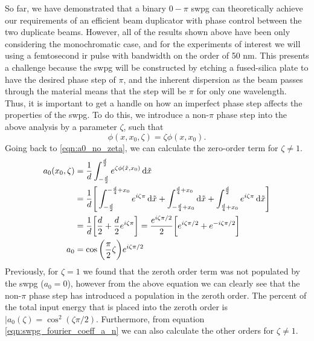 So far, we have demonstrated that a binary $0-\pi$ \gls{swpg} can theoretically achieve our requirements of an efficient beam duplicator with phase control between the two duplicate beams.  However, all of the results shown above have been only considering the monochromatic case, and for the experiments of interest we will using a femtosecond \gls{ir} pulse with bandwidth on the order of 50 nm.  This presents a challenge because the \gls{swpg} will be constructed by etching a fused-silica plate to have the desired phase step of $\pi$, and the inherent dispersion as the beam passes through the material means that the step will be $\pi$ for only one wavelength.  Thus, it is important to get a handle on how an imperfect phase step affects the properties of the \gls{swpg}.  To do this, we introduce a non-$\pi$ phase step into the above analysis by a parameter $\zeta$, such that
\begin{equation}
\label{eqn:zeta}
	\phi(x,x_0,\zeta)=\zeta \phi(x,x_0).
\end{equation}
Going back to \ref{eqn:a0_no_zeta}, we can calculate the zero-order term for $\zeta\neq1$.
\begin{equation}
\label{eqn:a_0_zeta}
	\begin{aligned}
	a_0(x_0,\zeta) &= \frac{1}{d}\int_{-\frac{d}{2}}^{\frac{d}{2}} e^{\zeta\phi(\tilde{x},x_0)}\mathop{}\!\mathrm{d}\tilde{x}\\
	&= \frac{1}{d}\Bigg[\int_{-\frac{d}{2}}^{-\frac{d}{4}+x_0}e^{i\zeta\pi}\mathop{}\!\mathrm{d}\tilde{x}
	+ \int_{-\frac{d}{4}+x_0}^{\frac{d}{4}+x_0} \mathop{}\!\mathrm{d}\tilde{x}
	+ \int_{\frac{d}{4}+x_0}^{\frac{d}{2}} e^{i\zeta\pi}\mathop{}\!\mathrm{d}\tilde{x} \Bigg]\\
	&=\frac{1}{d} \bigg[\frac{d}{2} + \frac{d}{2}e^{i\zeta\pi} \bigg] = \frac{e^{i\zeta\pi/2}}{2}\bigg[ e^{i\zeta\pi/2} 
	+ e^{-i\zeta\pi/2}\bigg]\\
	a_0 & = \cos\bigg(\frac{\pi}{2}\zeta\bigg)e^{i\zeta\pi/2}
	\end{aligned}
\end{equation}
Previously, for $\zeta=1$ we found that the zeroth order term was not populated by the \gls{swpg} ($a_0=0$), however from the above equation we can clearly see that the non-$\pi$ phase step has introduced a population in the zeroth order.  The percent of the total input energy that is placed into the zeroth order is $\rvert a_0(\zeta)=\cos^2(\zeta\pi/2)$. Furthermore, from equation \ref{eqn:swpg_fourier_coeff_a_n} we can also calculate the other orders for $\zeta\neq1$.
